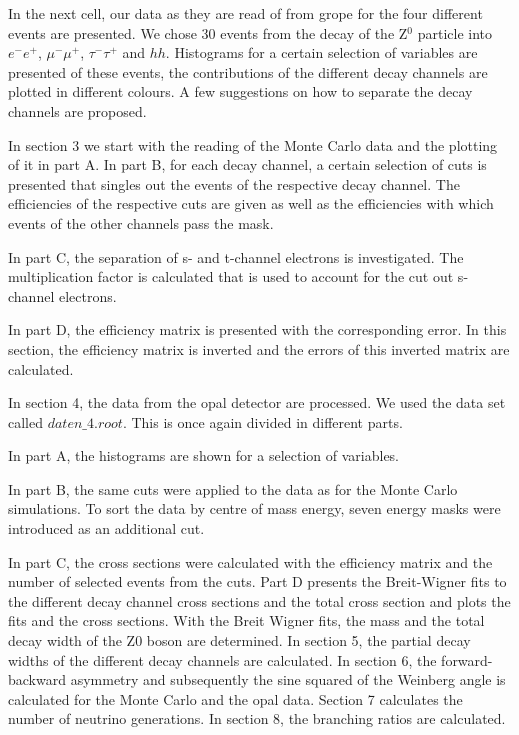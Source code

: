 \documentclass[11pt,titlepage]{article}
\begin{document}
In the next cell, our data as they are read of from grope for the four different events are presented. We chose 30 events from the decay of the Z$^0$ particle into $e^-e^+$, $\mu^- \mu^+$, $\tau^- \tau^+$ and $hh$. 
Histograms for a certain selection of variables are presented of these events, the contributions of the different decay channels are plotted in different colours.
A few suggestions on how to separate the decay channels are proposed.

In section 3 we start with the reading of the Monte Carlo data and the plotting of it in part A. 
In part B, for each decay channel, a certain selection of cuts is presented that singles out the events of the respective decay channel. The efficiencies of the respective cuts are given as well as the efficiencies with which events of the other channels pass the mask.

In part C, the separation of s- and t-channel electrons is investigated. The multiplication factor is calculated that is used to account for the cut out s-channel electrons.

In part D, the efficiency matrix is presented with the corresponding error. In this section, the efficiency matrix is inverted and the errors of this inverted matrix are calculated. 

In section 4, the data from the opal detector are processed. We used the data set called $daten\_4.root$. This is once again divided in different parts.

In part A, the histograms are shown for a selection of variables.

In part B, the same cuts were applied to the data as for the Monte Carlo simulations. To sort the data by centre of mass energy, seven energy masks were introduced as an additional cut.

In part C, the cross sections were calculated with the efficiency matrix and the number of selected events from the cuts.
Part D presents the Breit-Wigner fits to the different decay channel cross sections and the total cross section and plots the fits and the cross sections. With the Breit Wigner fits, the mass and the total decay width of the Z0 boson are determined.
In section 5, the partial decay widths of the different decay channels are calculated.
In section 6, the forward-backward asymmetry and subsequently the sine squared of the Weinberg angle is calculated for the Monte Carlo and the opal data.
Section 7 calculates the number of neutrino generations.
In section 8, the branching ratios are calculated.
\end{document}

